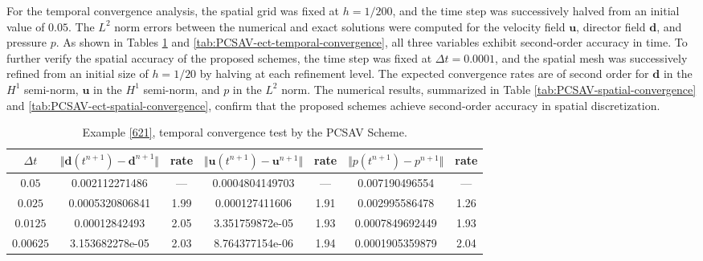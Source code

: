 \documentclass[12pt,reqno]{amsart}
\numberwithin{equation}{section}
\newcommand{\uu}{\mathrm{\textbf{u}}}
\newcommand{\dd}{\mathrm{\textbf{d}}}
\begin{document}
For the temporal convergence analysis, the spatial grid was fixed at $h = 1/200$, and the time step was successively halved from an initial value of $0.05$. The $L^2$ norm errors between the numerical and exact solutions were computed for the velocity field $\uu$, director field $\dd$, and pressure $p$.
As shown in Tables \ref{tab:PCSAV-temporal-convergence} and \ref{tab:PCSAV-ect-temporal-convergence}, all three variables exhibit second-order accuracy in time.
To further verify the spatial accuracy of the proposed schemes, the time step was fixed at $\Delta t = 0.0001$, and the spatial mesh was successively refined from an initial size of $h = 1/20$ by halving at each refinement level.
The expected convergence rates are of second order for $\dd$ in the $H^1$ semi-norm, $\uu$ in the $H^1$ semi-norm, and $p$ in the $L^2$ norm.
The numerical results, summarized in Table \ref{tab:PCSAV-spatial-convergence} and \ref{tab:PCSAV-ect-spatial-convergence}, confirm that the proposed schemes achieve second-order accuracy in spatial discretization.



\begin{table}[htbp]
\centering
\caption{\noindent
Example \ref{621}, temporal convergence test by the PCSAV Scheme.}
\label{tab:PCSAV-temporal-convergence}
\begin{tabular}{|c||c|c||c|c||c|c|}
\hline
$\Delta t$ 
& $\Vert \dd(t^{n+1})-\dd^{n+1}\Vert$ & rate 
& $\Vert \uu(t^{n+1})-\uu^{n+1}\Vert$ & rate 
& $\Vert p(t^{n+1})-p^{n+1}\Vert$ & rate \\ 
\hline
$0.05$ & 0.002112271486 & --- & 0.0004804149703 & --- & 0.007190496554 & --- \\ 
$0.025$ & 0.0005320806841 & 1.99 & 0.000127411606 & 1.91 & 0.002995586478 & 1.26 \\ 
$0.0125$ & 0.00012842493 & 2.05 & 3.351759872e-05 & 1.93 & 0.0007849692449 & 1.93 \\ 
$0.00625$ & 3.153682278e-05 & 2.03 & 8.764377154e-06 & 1.94 & 0.0001905359879 & 2.04 \\ 
\hline
\end{tabular}
\end{table}
\end{document}
